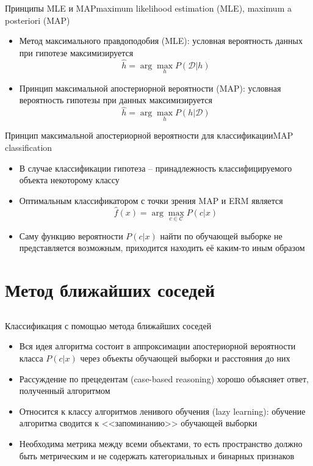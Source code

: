 \documentclass[red,unicode]{beamer}
\begin{document}
\begin{frame}{Принципы MLE и MAP}{maximum likelihood estimation (MLE), maximum a posteriori (MAP)}
\begin{itemize}
\item Метод максимального правдоподобия (MLE): условная вероятность данных при гипотезе максимизируется
$$
\hat h = \arg\max_h P(\mathcal{D}|h)
$$
\item Принцип максимальной апостериорной вероятности (MAP): условная вероятность гипотезы при данных максимизируется
$$
\hat h = \arg\max_h P(h|\mathcal{D})
$$
\end{itemize}
\end{frame}

\begin{frame}{Принцип максимальной апостериорной вероятности для классификации}{MAP classification}
\begin{itemize}
	\item В случае классификации гипотеза -- принадлежность классифицируемого объекта некоторому классу

	\item Оптимальным классификатором с точки зрения MAP и ERM является
$$
\hat f(x) = \arg\max_{c \in \mathcal{C}} P(c | x)
$$
	\item Саму функцию вероятности $P(c|x)$ найти по обучающей выборке не представляется возможным, приходится находить её каким-то иным образом
\end{itemize}
\end{frame}

\section{Метод ближайших соседей}
\subsection{}

\begin{frame}{Классификация с помощью метода ближайших соседей}
\begin{itemize}
	\item Вся идея алгоритма состоит в аппроксимации апостериорной вероятности класса $P(c|x)$ через объекты обучающей выборки и расстояния до них
	\item Рассуждение по прецедентам (case-based reasoning) хорошо объясняет ответ, полученный алгоритмом
	\item Относится к классу алгоритмов ленивого обучения (lazy learning): обучение алгоритма сводится к <<запоминанию>> обучающей выборки
	\item Необходима метрика между всеми объектами, то есть пространство должно быть метрическим и не содержать категориальных и бинарных признаков
\end{itemize}
\end{frame}
\end{document}

